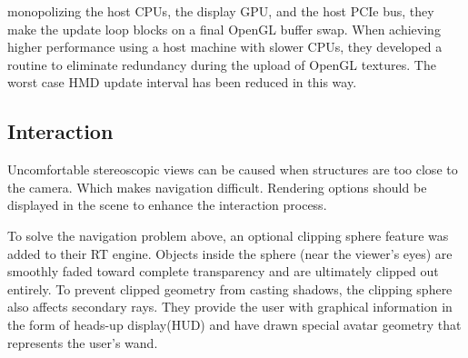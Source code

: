 \documentclass[10pt,twocolumn,letterpaper]{article}
\begin{document}
monopolizing the host CPUs, the display GPU, and the host PCIe bus, they make the update loop blocks on a final OpenGL buffer swap. When achieving higher performance using a host machine with slower CPUs, they developed a routine to eliminate redundancy during the upload of OpenGL textures. The worst case HMD update interval has been reduced in this way.

\subsection{Interaction}
Uncomfortable stereoscopic views can be caused when structures are too close to the camera. Which makes navigation difficult. Rendering options should be displayed in the scene to enhance the interaction process.

To solve the navigation problem above, an optional clipping sphere feature was added to their RT engine. Objects inside the sphere (near the viewer’s eyes) are smoothly faded toward complete transparency and are ultimately clipped out entirely. To prevent clipped geometry from casting shadows, the clipping sphere also affects secondary rays. They provide the user with graphical information in the form of heads-up display(HUD) and have drawn special avatar geometry that represents the user’s wand.
{\small


}
\end{document}
